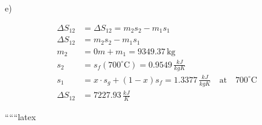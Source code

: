 e)

\begin{align*}
\Delta S_{12} &= \Delta S_{12} = m_2 s_2 - m_1 s_1 \\
\Delta S_{12} &= m_2 s_2 - m_1 s_1 \\
m_2 &= 0m + m_1 = 9349.37 \, \text{kg} \\
s_2 &= s_f (700^\circ \text{C}) = 0.9549 \, \frac{kJ}{kgK} \\
s_1 &= x \cdot s_g + (1 - x) s_f = 1.3377 \, \frac{kJ}{kgK} \quad \text{at} \quad 700^\circ \text{C} \\
\Delta S_{12} &= 7227.93 \, \frac{kJ}{K}
\end{align*}

``````latex